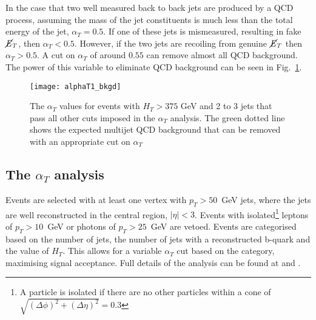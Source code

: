 In the case that two well measured back to back jets are produced by a QCD process, assuming the mass of the jet constituents is much less than the total energy of the jet, $\alpha_T=0.5$. If one of these jets is mismeasured, resulting in fake $\cancel{E}_T$, then $\alpha_T<0.5$. However, if the two jets are recoiling from genuine $\cancel{E}_T$ then $\alpha_T>0.5$. A cut on $\alpha_T$ of around $0.55$ can remove almost all QCD background. The power of this variable to eliminate QCD background can be seen in Fig.~\ref{fig:alphaT}.
\begin{figure}
	\begin{center}
		\texttt{[image: alphaT1\_bkgd]}
	\end{center}
	\caption{The $\alpha_T$ values for events with $H_T>375$ GeV and 2 to 3 jets that pass all other cuts imposed in the $\alpha_T$ analysis. The green dotted line shows the expected multijet QCD background that can be removed with an appropriate cut on $\alpha_T$ \cite{AlphaT8TeVChatrchyan:2013lya}}
	\label{fig:alphaT}
\end{figure}
\subsection{The \boldmath $\alpha_T$ analysis}
Events are selected with at least one vertex with $p_T>50$~GeV jets, where the jets are well reconstructed in the central region, $|\eta|<3$. Events with isolated\footnote{A particle is isolated if there are no other particles within a cone of $\sqrt{(\Delta\phi)^2+(\Delta\eta)^2}=0.3$} leptons of $p_T>10$~GeV or photons of $p_T>25$~GeV are vetoed. Events are categorised based on the number of jets, the number of jets with a reconstructed b-quark and the value of $H_T$. This allows for a variable $\alpha_T$ cut based on the category, maximising signal acceptance. Full details of the analysis can be found at \cite{AlphaT8TeVChatrchyan:2013lya} and \cite{AlphaT_7TeV_PRLChatrchyan:2011zy}.
